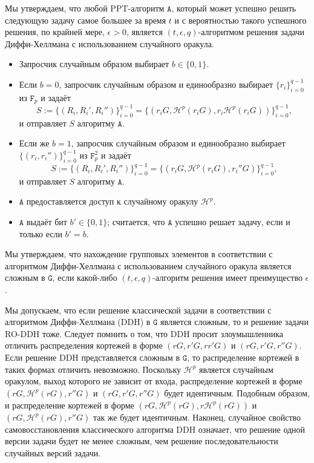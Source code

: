 \documentclass{llncs}
\newcommand{\A}{\texttt{A}}
\newcommand{\F}{\texttt{F}_p}
\newcommand{\G}{\texttt{G}}
\newcommand{\Hp}{\mathcal{H}^p}
\begin{document}
\begin{definition}\label{def:rom-ddh}
Мы утверждаем, что любой PPT-алгоритм $\A$, который может успешно решить следующую задачу самое большее за время $t$ и с вероятностью такого успешного решения, по крайней мере, $\epsilon > 0$, является $(t,\epsilon,q)$-алгоритмом решения задачи Диффи-Хеллмана с использованием случайного оракула.
\begin{itemize}
\item Запросчик случайным образом выбирает $b \in \{0,1\}$.
\item Если $b = 0$, запросчик случайным образом и единообразно выбирает $\{r_i\}_{i=0}^{q-1}$ из $\F$ и задаёт $$S := \{(R_i,R_i',R_i'')\}_{i=0}^{q-1} = \{(r_iG,\Hp(r_iG),r_i\Hp(r_iG))\}_{i=0}^{q-1},$$ и  отправляет $S$ алгоритму $\A$.
\item Если же $b = 1$, запросчик случайным образом и единообразно выбирает $\{(r_i,r_i'')\}_{i=0}^{q-1}$ из $\F^2$ и задаёт $$S := \{(R_i,R_i',R_i'')\}_{i=0}^{q-1} = \{(r_iG,\Hp(r_iG),r_i''G)\}_{i=0}^{q-1},$$ и отправляет $S$ алгоритму $\A$.
\item $\A$ предоставляется доступ к случайному оракулу $\Hp$.
\item $\A$ выдаёт бит $b' \in \{0,1\}$; считается, что $\A$ успешно решает задачу, если и только если $b' = b$.
\end{itemize}
Мы утверждаем, что нахождение групповых элементов в соответствии с алгоритмом Диффи-Хеллмана с использованием случайного оракула является сложным в $\G$, если какой-либо $(t,\epsilon,q)$-алгоритм решения имеет преимущество $\epsilon$.
\end{definition}

\begin{remark}
Мы допускаем, что если решение классической задачи в соответствии с алгоритмом Диффи-Хеллмана (DDH) в $\G$ является сложным, то и решение задачи RO-DDH тоже. Следует помнить о том, что DDH просит злоумышленника отличить распределения кортежей в форме $(rG,r'G,rr'G)$ и $(rG,r'G,r''G)$. Если решение DDH представляется сложным в $\G$, то распределение кортежей в таких формах отличить невозможно. Поскольку $\Hp$ является случайным оракулом, выход которого не зависит от входа, распределение кортежей в форме $(rG,\Hp(rG),r''G)$ и $(rG,r'G,r''G)$ будет идентичным. Подобным образом, и распределение кортежей в форме $(rG,\Hp(rG),r\Hp(rG))$ и $(rG,\Hp(rG),r''G)$ так же будет идентичным. Наконец, случайное свойство самовосстановления классического алгоритма DDH означает, что решение одной версии задачи будет не менее сложным, чем решение последовательности случайных версий задачи.
\end{remark}
\end{document}
